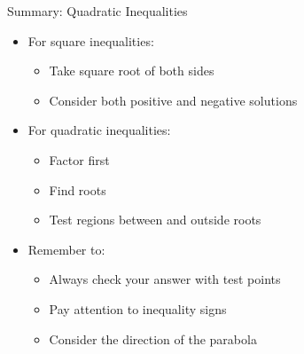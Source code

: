 \documentclass[aspectratio=169]{beamer}
\begin{document}
\begin{frame}{Summary: Quadratic Inequalities}
    \begin{tcolorbox}[colback=lightgray,colframe=primary,title=Key Points]
        \footnotesize
        \begin{itemize}
            \item For \textcolor{accent}{square inequalities}:
            \begin{itemize}
                \item Take square root of both sides
                \item Consider both positive and negative solutions
            \end{itemize}
            \item For \textcolor{accent}{quadratic inequalities}:
            \begin{itemize}
                \item Factor first
                \item Find roots
                \item Test regions between and outside roots
            \end{itemize}
            \item Remember to:
            \begin{itemize}
                \item Always check your answer with test points
                \item Pay attention to inequality signs
                \item Consider the direction of the parabola
            \end{itemize}
        \end{itemize}
    \end{tcolorbox}
\end{frame}
\end{document}
